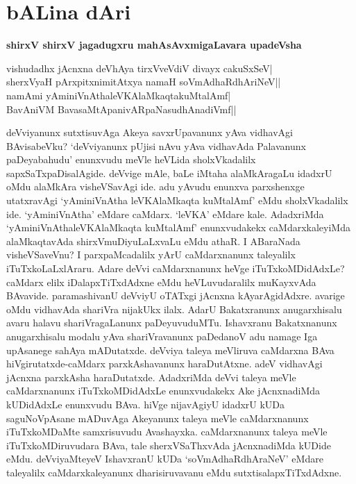 \chapter{bALina dAri}\label{chap1}

{\huge\bf shirxV shirxV jagadugxru mahAsAvxmigaLavara upadeVsha}

\begin{shloka}
vishudadhx jAcnxna deVhAya tirxVveVdiV divayx cakuSxSeV|\\
sherxVyaH pArxpitxnimitAtxya namaH soVmAdhaRdhAriNeV||\\
namAmi yAminiVnAthaleVKAlaMkaqtakuMtalAmf|\\
BavAniVM BavasaMtApanivARpaNasudhAnadiVmf||
\end{shloka}


deVviyanunx sutxtisuvAga Akeya savxrUpavanunx yAva vidhavAgi BAvisabeVku? `deVviyanunx pUjisi nAvu yAva 
vidhavAda Palavanunx paDeyabahudu' enunxvudu meVle heVLida sholxVkadalilx sapxSaTxpaDisalAgide. deVvige 
mAle, baLe iMtaha alaMkAragaLu idadxrU oMdu alaMkAra visheVSavAgi ide. adu yAvudu enunxva parxshenxge 
utatxravAgi `yAminiVnAtha leVKAlaMkaqta kuMtalAmf' eMdu sholxVkadalilx ide. `yAminiVnAtha' 
eMdare caMdarx. `leVKA' eMdare kale. AdadxriMda `yAminiVnAthaleVKAlaMkaqta kuMtalAmf' enunxvudakekx 
caMdarxkaleyiMda alaMkaqtavAda shirxVmuDiyuLaLxvaLu eMdu athaR. I ABaraNada visheVSaveVnu? I 
parxpaMcadalilx yArU caMdarxnanunx taleyalilx iTuTxkoLaLxlAraru. Adare deVvi caMdarxnanunx heVge iTuTxkoMDidAdxLe? caMdarx 
elilx iDalapxTiTxdAdxne eMdu heVLuvudaralilx muKayxvAda BAvavide. paramashivanU deVviyU oTATxgi 
jAcnxna kAyarAgidAdxre. avarige oMdu vidhavAda shariVra nijakUkx ilalx. AdarU Bakatxranunx anugarxhisalu 
avaru halavu shariVragaLanunx paDeyuvuduMTu. Ishavxranu Bakatxnanunx anugarxhisalu modalu yAva shariVravanunx 
paDedanoV adu namage Iga upAsanege sahAya mADutatxde. deVviya taleya meVliruva caMdarxna 
BAva hiVgirutatxde-caMdarx parxkAshavanunx haraDutAtxne. adeV vidhavAgi jAcnxna parxkAsha haraDutatxde. AdadxriMda deVvi 
taleya meVle caMdarxnanunx iTuTxkoMDidAdxLe enunxvudakekx Ake jAcnxnadiMda kUDidAdxLe enunxvudu BAva. hiVge 
nijavAgiyU idadxrU kUDa saguNoVpAsane mADuvAga Akeyanunx taleya meVle caMdarxnanunx iTuTxkoMDaMte 
samxrisuvudu Avashayxka. caMdarxnanunx taleya meVle iTuTxkoMDiruvudara BAva, tale sherxVSaThxvAda jAcnxnadiMda 
kUDide eMdu. deVviyaMteyeV IshavxranU kUDa `soVmAdhaRdhAraNeV' eMdare taleyalilx caMdarxkaleyanunx dharisiruvavanu eMdu sutxtisalapxTiTxdAdxne.

